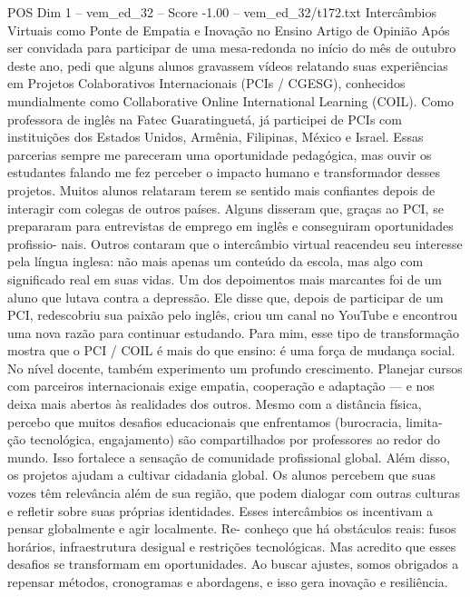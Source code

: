 \begin{textsample}{POS Dim 1 – vem\_ed\_32 – Score -1.00 – vem\_ed\_32/t172.txt}  \label{ex:f1_pos_060}
Intercâmbios Virtuais como Ponte de Empatia e Inovação no Ensino Artigo de Opinião Após ser convidada para participar de uma mesa-redonda no início do mês de outubro deste ano, pedi que alguns alunos gravassem vídeos relatando suas experiências em Projetos Colaborativos Internacionais (PCIs / CGESG), conhecidos mundialmente como Collaborative Online International Learning (COIL).
Como professora de inglês na Fatec Guaratinguetá, já participei de PCIs com instituições dos Estados Unidos, Armênia, Filipinas, México e Israel.
Essas parcerias sempre me pareceram uma oportunidade pedagógica, mas ouvir os estudantes falando me fez perceber o impacto humano e transformador desses projetos.
Muitos alunos relataram terem se sentido mais confiantes depois de interagir com colegas de outros países.
Alguns disseram que, graças ao PCI, se prepararam para entrevistas de emprego em inglês e conseguiram oportunidades profissio- nais.
Outros contaram que o intercâmbio virtual reacendeu seu interesse pela língua inglesa: não mais apenas um conteúdo da escola, mas algo com significado real em suas vidas.
Um dos depoimentos mais marcantes foi de um aluno que lutava contra a depressão.
Ele disse que, depois de participar de um PCI, redescobriu sua paixão pelo inglês, criou um canal no YouTube e encontrou uma nova razão para continuar estudando.
Para mim, esse tipo de transformação mostra que o PCI / COIL é mais do que ensino: é uma força de mudança social.
No nível docente, também experimento um profundo crescimento.
Planejar cursos com parceiros internacionais exige empatia, cooperação e adaptação — e nos deixa mais abertos às realidades dos outros.
Mesmo com a distância física, percebo que muitos desafios educacionais que enfrentamos (burocracia, limita- ção tecnológica, engajamento) são compartilhados por professores ao redor do mundo.
Isso fortalece a sensação de comunidade profissional global.
Além disso, os projetos ajudam a cultivar cidadania global.
Os alunos percebem que suas vozes têm relevância além de sua região, que podem dialogar com outras culturas e refletir sobre suas próprias identidades.
Esses intercâmbios os incentivam a pensar globalmente e agir localmente.
Re- conheço que há obstáculos reais: fusos horários, infraestrutura desigual e restrições tecnológicas.
Mas acredito que esses desafios se transformam em oportunidades.
Ao buscar ajustes, somos obrigados a repensar métodos, cronogramas e abordagens, e isso gera inovação e resiliência.

\end{textsample}
